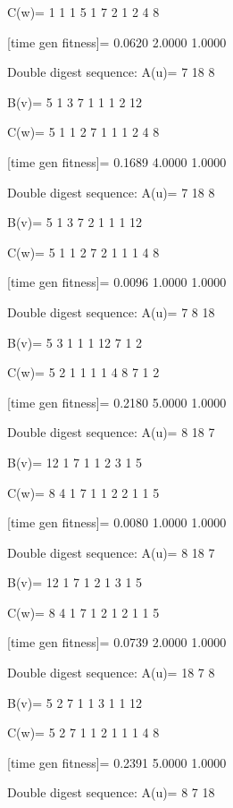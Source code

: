 C(w)=
     1     1     1     5     1     7     2     1     2     4     8

[time gen fitness]=
    0.0620    2.0000    1.0000

Double digest sequence:
A(u)=
     7    18     8

B(v)=
     5     1     3     7     1     1     1     2    12

C(w)=
     5     1     1     2     7     1     1     1     2     4     8

[time gen fitness]=
    0.1689    4.0000    1.0000

Double digest sequence:
A(u)=
     7    18     8

B(v)=
     5     1     3     7     2     1     1     1    12

C(w)=
     5     1     1     2     7     2     1     1     1     4     8

[time gen fitness]=
    0.0096    1.0000    1.0000

Double digest sequence:
A(u)=
     7     8    18

B(v)=
     5     3     1     1     1    12     7     1     2

C(w)=
     5     2     1     1     1     1     4     8     7     1     2

[time gen fitness]=
    0.2180    5.0000    1.0000

Double digest sequence:
A(u)=
     8    18     7

B(v)=
    12     1     7     1     1     2     3     1     5

C(w)=
     8     4     1     7     1     1     2     2     1     1     5

[time gen fitness]=
    0.0080    1.0000    1.0000

Double digest sequence:
A(u)=
     8    18     7

B(v)=
    12     1     7     1     2     1     3     1     5

C(w)=
     8     4     1     7     1     2     1     2     1     1     5

[time gen fitness]=
    0.0739    2.0000    1.0000

Double digest sequence:
A(u)=
    18     7     8

B(v)=
     5     2     7     1     1     3     1     1    12

C(w)=
     5     2     7     1     1     2     1     1     1     4     8

[time gen fitness]=
    0.2391    5.0000    1.0000

Double digest sequence:
A(u)=
     8     7    18

